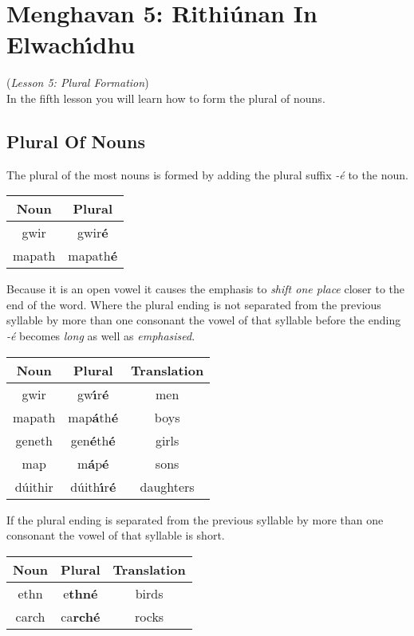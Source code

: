 \section{Menghavan 5: Rithi\'{u}nan In Elwach\'{\i}dhu}
(\textit{Lesson 5: Plural Formation})\\

In the fifth lesson you will learn how to form the plural of nouns.\\

\subsection{Plural Of Nouns}

The plural of the most nouns is formed by adding the plural suffix \textit{-\'{e}} to the noun.
\begin{table}[H]
\centering
\begin{tabu}{c|c}
  \textbf{Noun} & \textbf{Plural}\\
  \toprule
  gwir & gwir\textbf{\'{e}}\\
  mapath & mapath\textbf{\'{e}}
\end{tabu}
\label{example_noun_plural}
\end{table}

Because it is an open vowel it causes the emphasis to \textit{shift one place} closer to the end of the word. Where the plural ending is not separated from the previous syllable by more than one consonant the vowel of that syllable before the ending \textit{-\'{e}} becomes \textit{long} as well as \textit{emphasised}.
\begin{table}[H]
\centering
\begin{tabu}{c|c|c}
  \textbf{Noun} & \textbf{Plural} & \textbf{Translation}\\
  \toprule
  gwir & gw\textbf{\'{\i}}r\textbf{\'{e}} & men\\
  mapath & map\textbf{\'{a}}th\textbf{\'{e}} & boys\\
  geneth & gen\textbf{\'{e}}th\textbf{\'{e}} & girls\\
  map & m\textbf{\'{a}}p\textbf{\'{e}} & sons\\
  d\'{u}ithir & d\'{u}ith\textbf{\'{\i}}r\textbf{\'{e}} & daughters
\end{tabu}
\label{example_emphasis_shift}
\end{table}

If the plural ending is separated from the previous syllable by more than one consonant the vowel of that syllable is short.
\begin{table}[H]
\centering
\begin{tabu}{c|c|c}
  \textbf{Noun} & \textbf{Plural} & \textbf{Translation}\\
  \toprule
  ethn & e\textbf{thn\'{e}} & birds\\
  carch & ca\textbf{rch\'{e}} & rocks\\
\end{tabu}
\label{example_plural_multiple_consonants}
\end{table}

